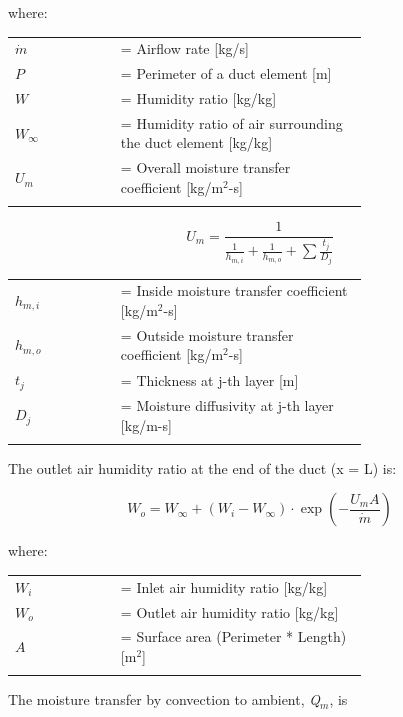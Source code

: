 where:

\begin{tabular}{lp{0.7\linewidth}}
\\
$\dot{m}$ &= Airflow rate [kg/s]\\
$P$ &= Perimeter of a duct element [m]\\
$W$ &= Humidity ratio [kg/kg]\\
$W_\infty$ &= Humidity ratio of air surrounding the duct element [kg/kg]\\
$U_m$ &= Overall moisture transfer coefficient [kg/m\(^{2}\)-s]\\
\\
\end{tabular}

\begin{equation}
U_m = \frac{1}{\frac{1}{h_{m,i}} + \frac{1}{h_{m,o}} + \sum {\frac{t_j}{D_j}} }
\end{equation}

\begin{tabular}{lp{0.7\linewidth}}
\\
$h_{m,i}$ &= Inside moisture transfer coefficient [kg/m\(^{2}\)-s]\\
$h_{m,o}$ &= Outside moisture transfer coefficient [kg/m\(^{2}\)-s]\\
$t_j$ &= Thickness at j-th layer [m]\\
$D_j$ &= Moisture diffusivity at j-th layer [kg/m-s]\\
\\
\end{tabular}

The outlet air humidity ratio at the end of the duct (x = L) is:

\begin{equation}
W_o = W_\infty + (W_i - W_\infty) \cdot \exp \left(- \frac{U_m A}{\dot{m}} \right)
\end{equation}

where:

\begin{tabular}{lp{0.7\linewidth}}
\\
$W_i$ &= Inlet air humidity ratio [kg/kg]\\
$W_o$ &= Outlet air humidity ratio [kg/kg]\\
$A$ &= Surface area (Perimeter * Length) [m\(^{2}\)]\\
\\
\end{tabular}

The moisture transfer by convection to ambient, \emph{Q\(_{m}\)}, is

